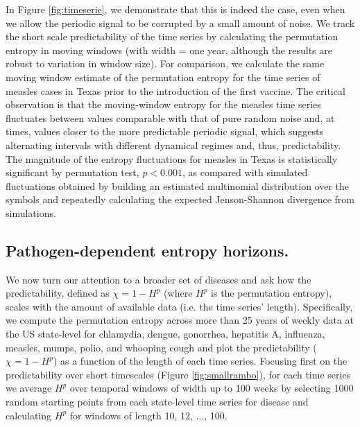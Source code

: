 \documentclass[fleqn,12pt]{wlscirep}
\begin{document}
In Figure \ref{fig:timeserie}, we demonstrate that this is indeed the case, even when we allow the periodic signal to be corrupted by a small amount of noise. We track the short scale predictability of the time series by calculating the permutation entropy in moving windows (with width = one year, although the results are robust to variation in window size). For comparison, we calculate the same moving window estimate of the permutation entropy for the time series of measles cases in Texas prior to the introduction of the first vaccine. The critical observation is that the moving-window entropy for the measles time series fluctuates between values comparable with that of pure random noise and, at times, values closer to the more predictable periodic signal, which suggests alternating intervals with different dynamical regimes and, thus, predictability. The magnitude of the entropy fluctuations for measles in Texas is statistically significant by permutation test, $p<0.001$, as compared with simulated fluctuations obtained by building an estimated multinomial distribution over the symbols and repeatedly calculating the expected Jenson-Shannon divergence from simulations.

\subsection*{Pathogen-dependent entropy horizons.}
We now turn our attention to a broader set of diseases and ask how the predictability, defined as $\chi = 1 - H^p$ (where $H^p$ is the permutation entropy), scales with the amount of available data (i.e. the time series' length).  Specifically, we compute the permutation entropy across more than 25 years of weekly data at the US state-level for chlamydia, dengue, gonorrhea, hepatitis A, influenza, measles, mumps, polio, and whooping cough and plot the predictability ($\chi = 1 - H^p$) as a function of the length of each time series. Focusing first on the predictability over short timescales (Figure \ref{fig:smallrambo}), for each time series we average $H^p$ over temporal windows of width up to 100 weeks by selecting 1000 random starting points from each state-level time series for disease and calculating $H^p$ for windows of length 10, 12, ..., 100.
\end{document}
